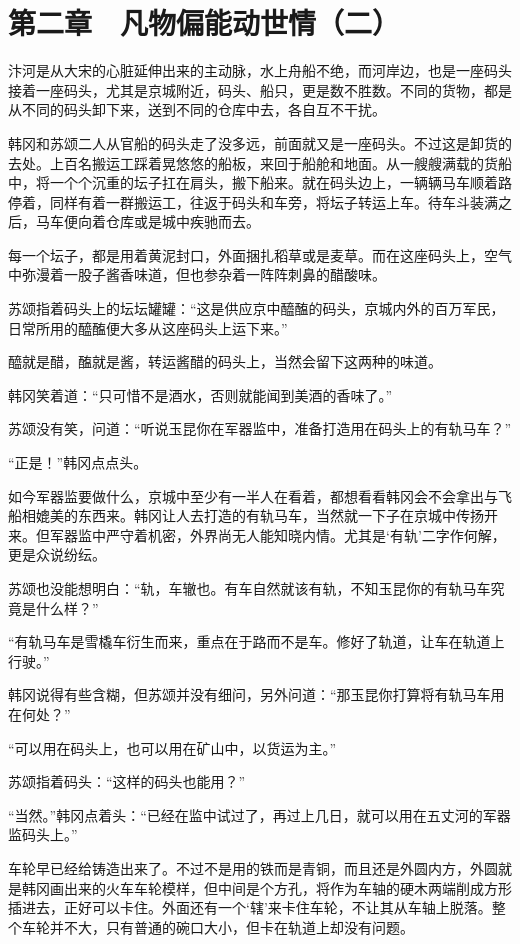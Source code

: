 \section{第二章　凡物偏能动世情（二）}

汴河是从大宋的心脏延伸出来的主动脉，水上舟船不绝，而河岸边，也是一座码头接着一座码头，尤其是京城附近，码头、船只，更是数不胜数。不同的货物，都是从不同的码头卸下来，送到不同的仓库中去，各自互不干扰。

韩冈和苏颂二人从官船的码头走了没多远，前面就又是一座码头。不过这是卸货的去处。上百名搬运工踩着晃悠悠的船板，来回于船舱和地面。从一艘艘满载的货船中，将一个个沉重的坛子扛在肩头，搬下船来。就在码头边上，一辆辆马车顺着路停着，同样有着一群搬运工，往返于码头和车旁，将坛子转运上车。待车斗装满之后，马车便向着仓库或是城中疾驰而去。

每一个坛子，都是用着黄泥封口，外面捆扎稻草或是麦草。而在这座码头上，空气中弥漫着一股子酱香味道，但也参杂着一阵阵刺鼻的醋酸味。

苏颂指着码头上的坛坛罐罐：“这是供应京中醯醢的码头，京城内外的百万军民，日常所用的醯醢便大多从这座码头上运下来。”

醯就是醋，醢就是酱，转运酱醋的码头上，当然会留下这两种的味道。

韩冈笑着道：“只可惜不是酒水，否则就能闻到美酒的香味了。”

苏颂没有笑，问道：“听说玉昆你在军器监中，准备打造用在码头上的有轨马车？”

“正是！”韩冈点点头。

如今军器监要做什么，京城中至少有一半人在看着，都想看看韩冈会不会拿出与飞船相媲美的东西来。韩冈让人去打造的有轨马车，当然就一下子在京城中传扬开来。但军器监中严守着机密，外界尚无人能知晓内情。尤其是‘有轨’二字作何解，更是众说纷纭。

苏颂也没能想明白：“轨，车辙也。有车自然就该有轨，不知玉昆你的有轨马车究竟是什么样？”

“有轨马车是雪橇车衍生而来，重点在于路而不是车。修好了轨道，让车在轨道上行驶。”

韩冈说得有些含糊，但苏颂并没有细问，另外问道：“那玉昆你打算将有轨马车用在何处？”

“可以用在码头上，也可以用在矿山中，以货运为主。”

苏颂指着码头：“这样的码头也能用？”

“当然。”韩冈点着头：“已经在监中试过了，再过上几日，就可以用在五丈河的军器监码头上。”

车轮早已经给铸造出来了。不过不是用的铁而是青铜，而且还是外圆内方，外圆就是韩冈画出来的火车车轮模样，但中间是个方孔，将作为车轴的硬木两端削成方形插进去，正好可以卡住。外面还有一个‘辖’来卡住车轮，不让其从车轴上脱落。整个车轮并不大，只有普通的碗口大小，但卡在轨道上却没有问题。

